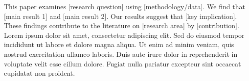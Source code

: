 %
%

\thispagestyle{empty}

\titlefootnotesetup

\begin{center}

\vspace*{\titlespaceminor}



\articledate{\today}

\begin{articleabstract}
This paper examines [research question] using [methodology/data]. We find that [main result 1] and [main result 2]. Our results suggest that [key implication]. These findings contribute to the literature on [research area] by [contribution]. Lorem ipsum dolor sit amet, consectetur adipiscing elit. Sed do eiusmod tempor incididunt ut labore et dolore magna aliqua. Ut enim ad minim veniam, quis nostrud exercitation ullamco laboris. Duis aute irure dolor in reprehenderit in voluptate velit esse cillum dolore. Fugiat nulla pariatur excepteur sint occaecat cupidatat non proident.
\end{articleabstract}


\end{center}

\clearpage

\titlefootnotereset

